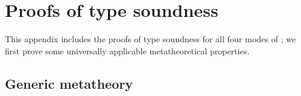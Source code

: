 \documentclass[9pt]{extarticle}
\begin{document}
\vspace*{1.0em}





\pagebreak
\appendix
\numbertheoremstrue

\section{Proofs of type soundness}
\label{app:typesoundness}

This appendix includes the proofs of type soundness for all four modes
of \lambdah; we first prove some universally applicable
metatheoretical properties.

\subsection{Generic metatheory}
\label{app:genericmetatheory}
\end{document}
